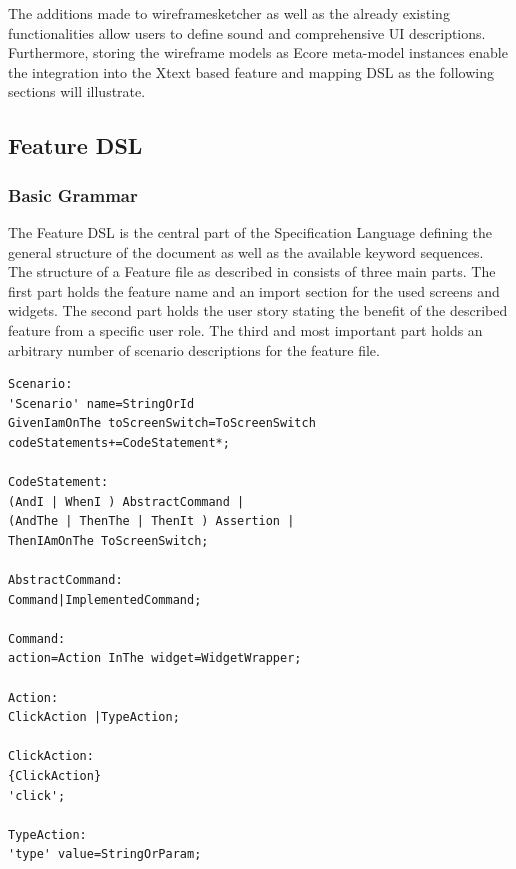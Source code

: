 \documentclass{sig-alternate-05-2015}
\begin{document}
The additions made to wireframesketcher as well as the already existing functionalities allow users to define sound and comprehensive UI descriptions. 
Furthermore, storing the wireframe models as Ecore meta-model instances enable the integration into the Xtext based feature and mapping DSL as the following sections will illustrate.

\subsection{Feature DSL}
\subsubsection{Basic Grammar}
The Feature DSL is the central part of the Specification Language defining the general structure of the document as well as the available keyword sequences.
The structure of a Feature file as described in  consists of three main parts.
The first part holds the feature name and an import section for the used screens and widgets.
The second part holds the user story stating the benefit of the described feature from a specific user role.
The third and most important part holds an arbitrary number of scenario descriptions for the feature file.

\begin{lstlisting}[captionpos=b, caption=Feature Grammar, label={lst:featureGrammar}, language=xtext]
Scenario:
'Scenario' name=StringOrId
GivenIamOnThe toScreenSwitch=ToScreenSwitch 
codeStatements+=CodeStatement*;

CodeStatement:
(AndI | WhenI ) AbstractCommand | 
(AndThe | ThenThe | ThenIt ) Assertion |   
ThenIAmOnThe ToScreenSwitch;

AbstractCommand:
Command|ImplementedCommand;

Command:
action=Action InThe widget=WidgetWrapper;

Action:
ClickAction |TypeAction;

ClickAction:
{ClickAction}
'click';

TypeAction:
'type' value=StringOrParam;
\end{lstlisting}
\end{document}
